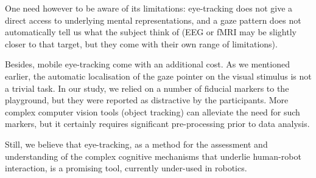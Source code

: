 \documentclass{sig-alternate}
\begin{document}
One need however to be aware of its limitations: eye-tracking does not give a direct
access to underlying mental representations, and a gaze pattern does not
automatically tell us what the subject think of (EEG or fMRI may be slightly
closer to that target, but they come with their own range of limitations).

Besides, mobile eye-tracking come with an additional cost. As
we mentioned earlier, the automatic localisation of the gaze pointer on
the visual stimulus is not a trivial task. In our study, we relied on a 
number of fiducial markers to the playground, but they were reported as
distractive by the participants. More complex computer vision tools (object
tracking) can alleviate the need for such markers, but it certainly requires
significant pre-processing prior to data analysis.

Still, we believe that eye-tracking, as a method for the assessment and
understanding of the complex cognitive mechanisms that underlie human-robot
interaction, is a promising tool, currently under-used in robotics.



%




\balancecolumns
\end{document}

